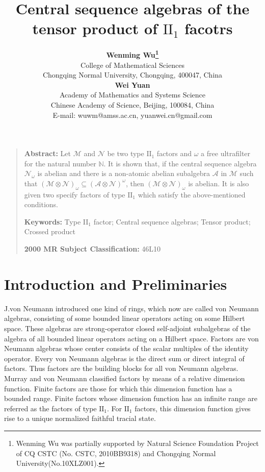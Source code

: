 \documentclass[12pt]{article}
\begin{document}
\title{\textbf{Central sequence algebras of the tensor product of $\mathrm{II}_{1}$ facotrs}}



\author{\textbf{Wenming Wu\thanks{Wenming Wu was partially supported
by Natural Science
Foundation Project of CQ CSTC (No. CSTC, 2010BB9318) and Chongqing Normal University(No.10XLZ001).}} \\
{\small College of Mathematical Sciences}\\
{\small Chongqing Normal University, Chongqing, 400047, China}\\
\textbf{Wei Yuan}\\
{\small Academy of Mathematics and Systems Science}\\
{\small Chinese Academy of Science, Beijing, 100084, China}\\
{\small E-mail: wuwm@amss.ac.cn, yuanwei.cn@gmail.com} }
\date{}
\maketitle
\def\M{{\mathscr{M}}}
\baselineskip=12.5pt \vskip0.1cm
\begin{quote}
\textbf{Abstract:} { Let $\mathcal{M}$ and $\mathcal{N}$ be two type
$\mathrm{II}_{1}$ factors and $\omega$ a free ultrafilter for the
natural number $\mathbb{N}$. It is shown that, if the central
sequence algebra $\mathcal{N}_{\omega}$ is abelian and there is a
non-atomic abelian subalgebra $\mathcal{A}$ in $\mathcal{M}$ such
that
$(\mathcal{M}\otimes\mathcal{N})_{\omega}\subseteq(\mathcal{A}\otimes\mathcal{N})^{\omega}$,
then $(\mathcal{M}\otimes\mathcal{N})_{\omega}$ is abelian. It is
also given two specify factors of type $\mathrm{II}_{1}$ which
satisfy the above-mentioned conditions.}

\textbf{Keywords:} {Type II$_1 $ factor; Central sequence algebras;
Tensor product; Crossed product}

{\small \textbf{2000 MR Subject Classification:} 46L10}
\end{quote}


\section{Introduction and Preliminaries}

J.von Neumann introduced one kind of rings, which now are called von
Neumann algebras, consisting of some bounded linear operators acting
on some Hilbert space. These algebras are strong-operator closed
self-adjoint subalgebras of the algebra of all bounded linear
operators acting on a Hilbert space. Factors are von Neumann
algebras whose center consists of the scalar multiples of the
identity operator. Every von Neumann algebras is the direct sum or
direct integral of factors. Thus factors are the building blocks for
all von Neumann algebras. Murray and von Neumann classified factors
by means of a relative dimension function. Finite factors are those
for which this dimension function has a bounded range. Finite
factors whose dimension function has an infinite range are referred
as the factors of type $\mathrm{II}_{1}$. For $\mathrm{II}_{1}$
factors, this dimension function gives rise to a unique normalized
faithful tracial state.
\end{document}
